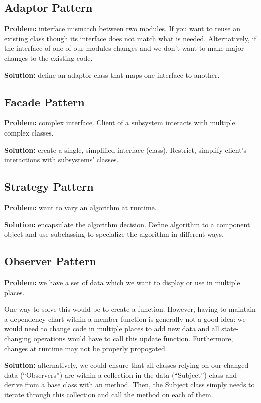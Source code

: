 \documentclass[12pt]{article}
\begin{document}
\subsection{Adaptor Pattern}
{\bf Problem:} interface mismatch between two modules. If you want to reuse an existing class though its interface does not match what is needed. Alternatively, if the interface of one of our modules changes and we don't want to make major changes to the existing code.

{\bf Solution:} define an adaptor class that maps one interface to another.

\subsection{Facade Pattern}
{\bf Problem:} complex interface. Client of a subsystem interacts with multiple complex classes.

{\bf Solution:} create a single, simplified interface (class). Restrict, simplify client's interactions with subsystems' classes.

\subsection{Strategy Pattern}
{\bf Problem:} want to vary an algorithm at runtime.

{\bf Solution:} encapsulate the algorithm decision. Define algorithm to a component object and use subclassing to specialize the algorithm in different ways.

\subsection{Observer Pattern}
{\bf Problem:} we have a set of data which we want to display or use in multiple places.

One way to solve this would be to create a  function. However, having to maintain a dependency chart within a member function is generally not a good idea: we would need to change code in multiple places to add new data and all state-changing operations would have to call this update function. Furthermore, changes at runtime may not be properly propogated.

{\bf Solution:} alternatively, we could ensure that all classes relying on our changed data (``Observers'') are within a collection in the data (``Subject'') class and derive from a base class with an  method. Then, the Subject class simply needs to iterate through this collection and call the  method on each of them.
\end{document}
